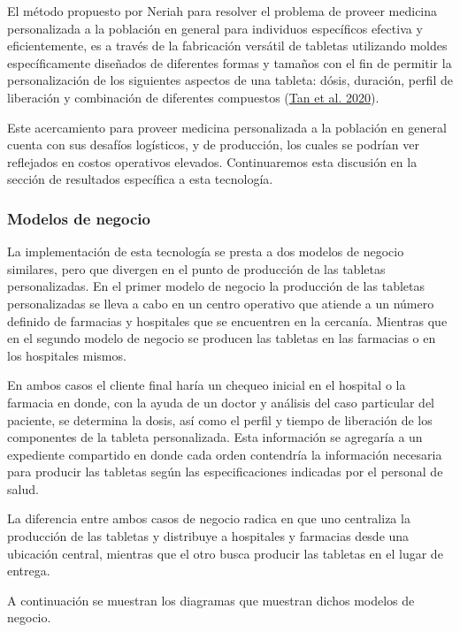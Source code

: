\documentclass[
]{book}
\begin{document}
El método propuesto por Neriah para resolver el problema de proveer
medicina personalizada a la población en general para individuos
específicos efectiva y eficientemente, es a través de la fabricación
versátil de tabletas utilizando moldes específicamente diseñados de
diferentes formas y tamaños con el fin de permitir la personalización de
los siguientes aspectos de una tableta: dósis, duración, perfil de
liberación y combinación de diferentes compuestos (\protect\hyperlink{ref-Neriah2020}{Tan et al. 2020}).

Este acercamiento para proveer medicina personalizada a la población en
general cuenta con sus desafíos logísticos, y de producción, los cuales
se podrían ver reflejados en costos operativos elevados. Continuaremos
esta discusión en la sección de resultados específica a esta tecnología.

\hypertarget{modelos-de-negocio}{%
\subsubsection{Modelos de negocio}\label{modelos-de-negocio}}

La implementación de esta tecnología se presta a dos modelos de negocio
similares, pero que divergen en el punto de producción de las tabletas
personalizadas. En el primer modelo de negocio la producción de las
tabletas personalizadas se lleva a cabo en un centro operativo que
atiende a un número definido de farmacias y hospitales que se encuentren
en la cercanía. Mientras que en el segundo modelo de negocio se producen
las tabletas en las farmacias o en los hospitales mismos.

En ambos casos el cliente final haría un chequeo inicial en el hospital
o la farmacia en donde, con la ayuda de un doctor y análisis del caso
particular del paciente, se determina la dosis, así como el perfil y
tiempo de liberación de los componentes de la tableta personalizada.
Esta información se agregaría a un expediente compartido en donde cada
orden contendría la información necesaria para producir las tabletas
según las especificaciones indicadas por el personal de salud.

La diferencia entre ambos casos de negocio radica en que uno centraliza la
producción de las tabletas y distribuye a hospitales y farmacias desde una
ubicación central, mientras que el otro busca producir las tabletas en el
lugar de entrega.

A continuación se muestran los diagramas que muestran dichos modelos de negocio.
\end{document}
